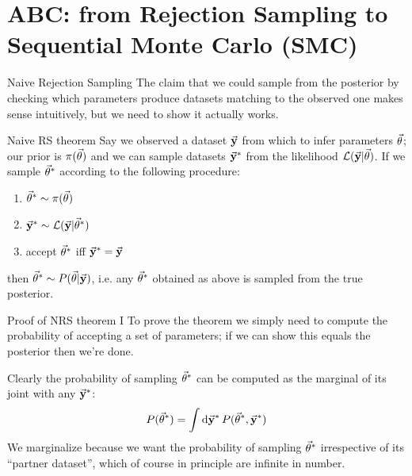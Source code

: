 \documentclass{beamer}
\theoremstyle{remark}
\renewcommand{\L}{\mathcal{L}}
\begin{document}
\section{ABC: from Rejection Sampling to Sequential Monte Carlo (SMC)}
\begin{frame}{Naive Rejection Sampling}
The claim that we could sample from the posterior by checking which parameters produce datasets matching to the observed one makes sense intuitively, but we need to show it actually works.
\pause
\begin{block}{Naive RS theorem}
Say we observed a dataset $\va{y}$ from which to infer parameters $\va{\theta}$; our prior is $\pi(\va{\theta})$ and we can sample datasets $\va{y}^*$ from the likelihood $\L(\va{y}|\va{\theta})$. If we sample $\va{\theta}^*$ according to the following procedure:
\begin{enumerate}
    \item $\va{\theta}^*\sim \pi(\va{\theta})$
    \item $\va{y}^*\sim \L(\va{y}|\va{\theta}^*)$
    \item accept $\va{\theta}^*$ iff $\va{y}^*=\va{y}$
\end{enumerate}
then $\va{\theta}^*\sim P(\va{\theta}|\va{y})$, i.e. any $\va{\theta}^*$ obtained as above is sampled from the true posterior.
\end{block}
\end{frame}

\begin{frame}{Proof of NRS theorem I}
To prove the theorem we simply need to compute the probability of accepting a set of parameters; if we can show this equals the posterior then we're done.
\pause

Clearly the probability of sampling $\va{\theta}^*$ can be computed as the marginal of its joint with any $\va{y}^*$:
\begin{equation*}
    P(\va{\theta}^*) = \int \dd{\va{y}^*} P(\va{\theta}^*, \va{y}^*)
\end{equation*}
We marginalize because we want the probability of sampling $\va{\theta}^*$ irrespective of its ``partner dataset'', which of course in principle are infinite in number.
\end{frame}
\end{document}

